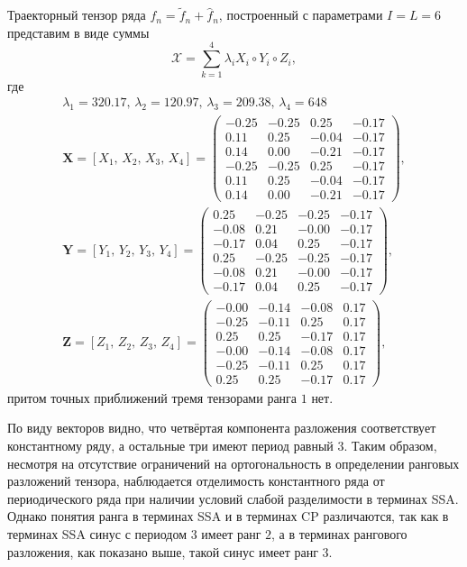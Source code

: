 \documentclass[specialist,
    substylefile = spbu_report.rtx,
    subf,href,colorlinks=true, 12pt]{disser}
\theoremstyle{plain}
\theoremstyle{definition}
\theoremstyle{remark}
\begin{document}
    Траекторный тензор ряда $f_n=\tilde{f}_n+\hat{f}_n$, построенный с параметрами $I=L=6$ представим в виде суммы
    \[
        \mathcal{X}=\sum_{k=1}^{4}\lambda_i X_i \circ Y_i\circ Z_i,
    \]
    где
    \begin{gather*}
        \lambda_1 =320.17,\, \lambda_2 =120.97,\, \lambda_3 =209.38,\, \lambda_4=648\\
        \mathbf{X}=[X_1,\, X_2,\, X_3,\, X_4] =
        \begin{pmatrix}
            -0.25 & -0.25 & 0.25 & -0.17 \\
            0.11 & 0.25 & -0.04 & -0.17 \\
            0.14 & 0.00 & -0.21 & -0.17 \\
            -0.25 & -0.25 & 0.25 & -0.17 \\
            0.11 & 0.25 & -0.04 & -0.17 \\
            0.14 & 0.00 & -0.21 & -0.17
        \end{pmatrix},\\
        \mathbf{Y}=[Y_1,\, Y_2,\, Y_3,\, Y_4] =
        \begin{pmatrix}
            0.25 & -0.25 & -0.25 & -0.17 \\
            -0.08 & 0.21 & -0.00 & -0.17 \\
            -0.17 & 0.04 & 0.25 & -0.17 \\
            0.25 & -0.25 & -0.25 & -0.17 \\
            -0.08 & 0.21 & -0.00 & -0.17 \\
            -0.17 & 0.04 & 0.25 & -0.17
        \end{pmatrix},\\
        \mathbf{Z}=[Z_1,\, Z_2,\, Z_3,\, Z_4] =
        \begin{pmatrix}
            -0.00 & -0.14 & -0.08 & 0.17 \\
            -0.25 & -0.11 & 0.25 & 0.17 \\
            0.25 & 0.25 & -0.17 & 0.17 \\
            -0.00 & -0.14 & -0.08 & 0.17 \\
            -0.25 & -0.11 & 0.25 & 0.17 \\
            0.25 & 0.25 & -0.17 & 0.17
        \end{pmatrix},
    \end{gather*}
    притом точных приближений тремя тензорами ранга $1$ нет.

    По виду векторов видно, что четвёртая компонента разложения соответствует константному ряду, а остальные три имеют период равный $3$.
    Таким образом, несмотря на отсутствие ограничений на ортогональность в определении ранговых разложений тензора, наблюдается
    отделимость константного ряда от периодического ряда при наличии условий слабой разделимости в терминах SSA\@.
    Однако понятия ранга в терминах SSA и в терминах CP различаются, так как в терминах SSA синус с периодом $3$ имеет ранг $2$, а в
    терминах рангового разложения, как показано выше, такой синус имеет ранг $3$.
\end{document}
